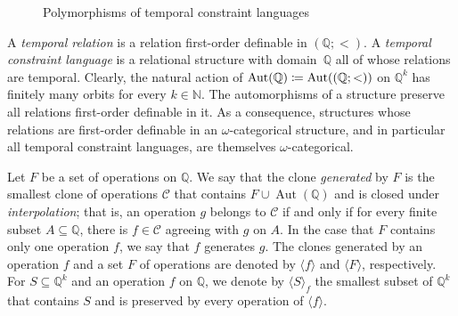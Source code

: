 \documentclass[a4paper,reqno, cleveref]{amsart}
\newcommand{\coloneqq}{\mathrel{\mathop:}\mathrel{\mkern-1.2mu}=}
\newcommand{\N}{\mathbb{N}}
\newcommand{\Q}{\mathbb{Q}}
\DeclareMathOperator{\Aut}{Aut}
\DeclareMathOperator{\mx}{mx}
\DeclareMathOperator{\mi}{mi}
\DeclareMathOperator{\dual}{dual}
\DeclareMathOperator{\lex}{lex}
\newcommand{\clone}[1]{\mathcal{#1}}
\newcommand{\gen}[1]{\langle#1\rangle}
\newcommand{\genrel}[2]{\langle{#1}\rangle_{#2}}
\newcommand{\johanna}[1]{\todo{\textbf{Johanna:} #1}}
\newcommand{\moritz}[1]{\todo{\textbf{Moritz:} #1}}
\begin{document}
\begin{figure}  %
    \centering
    
    \caption{Polymorphisms of temporal constraint languages}
    \label{fig:classification}
    \vspace{\baselineskip}

\end{figure}

A \emph{temporal relation} is a relation first-order definable in $(\Q; <)$. A \emph{temporal constraint language} is a relational structure with domain~$\Q$ all of whose relations are temporal. Clearly, the natural action of $\Aut(\Q)\coloneqq\Aut((\Q; <))$ on $\Q^k$ has finitely many orbits for every $k\in \N$. 
%
The automorphisms of a structure preserve all  relations first-order definable in it. 
%
As a consequence, structures whose relations are first-order definable in an $\omega$-categorical structure, %
%
and in particular all temporal constraint languages, are themselves $\omega$-categorical. 



Let $F$ be a set of operations on $\Q$. We say that the clone \emph{generated} by $F$ is the smallest clone  of operations $\clone C$ that contains $F\cup \Aut(\Q)$ and is closed under \emph{interpolation}; that is, an operation $g$ belongs to $\clone C$ if and only if for every finite subset $A\subseteq \mathbb Q$, there is $f\in \clone C$ agreeing with $g$ on $A$. In the case that $F$ contains only one operation $f$, we say that $f$ generates $g$. The clones generated by an operation $f$ and a set $F$ of operations are denoted by $\gen f$ and $\gen F$, respectively.   For $S\subseteq \Q^k$ and an operation $f$ on $\Q$, we denote by $\genrel{S}{f}$ the smallest subset of $\Q^k$ that contains $S$ and is preserved by every operation of $\gen{f}.$
 
\end{document}
